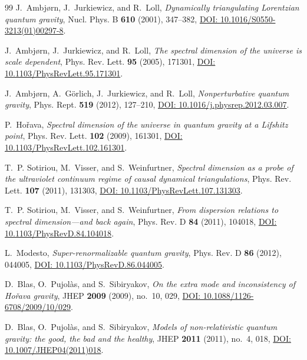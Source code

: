 \documentclass[11pt,a4paper,reqno]{amsart}
\theoremstyle{definition}
\numberwithin{equation}{section}
\begin{document}
\begin{thebibliography}{99}
J.~Ambj{\o}rn, J.~Jurkiewicz, and R.~Loll,
\emph{Dynamically triangulating Lorentzian quantum gravity},
Nucl. Phys. B \textbf{610} (2001), 347--382, \href{https://doi.org/10.1016/S0550-3213(01)00297-8}{DOI: 10.1016/S0550-3213(01)00297-8}.

J.~Ambj{\o}rn, J.~Jurkiewicz, and R.~Loll,
\emph{The spectral dimension of the universe is scale dependent},
Phys. Rev. Lett. \textbf{95} (2005), 171301, \href{https://doi.org/10.1103/PhysRevLett.95.171301}{DOI: 10.1103/PhysRevLett.95.171301}.

J.~Ambj{\o}rn, A.~G{\"o}rlich, J.~Jurkiewicz, and R.~Loll,
\emph{Nonperturbative quantum gravity},
Phys. Rept. \textbf{519} (2012), 127--210, \href{https://doi.org/10.1016/j.physrep.2012.03.007}{DOI: 10.1016/j.physrep.2012.03.007}.

P.~Ho\v{r}ava,
\emph{Spectral dimension of the universe in quantum gravity at a Lifshitz point},
Phys. Rev. Lett. \textbf{102} (2009), 161301, \href{https://doi.org/10.1103/PhysRevLett.102.161301}{DOI: 10.1103/PhysRevLett.102.161301}.

T.~P. Sotiriou, M.~Visser, and S.~Weinfurtner,
\emph{Spectral dimension as a probe of the ultraviolet continuum regime of causal dynamical triangulations},
Phys. Rev. Lett. \textbf{107} (2011), 131303, \href{https://doi.org/10.1103/PhysRevLett.107.131303}{DOI: 10.1103/PhysRevLett.107.131303}.

T.~P. Sotiriou, M.~Visser, and S.~Weinfurtner,
\emph{From dispersion relations to spectral dimension---and back again},
Phys. Rev. D \textbf{84} (2011), 104018, \href{https://doi.org/10.1103/PhysRevD.84.104018}{DOI: 10.1103/PhysRevD.84.104018}.

L.~Modesto,
\emph{Super-renormalizable quantum gravity},
Phys. Rev. D \textbf{86} (2012), 044005, \href{https://doi.org/10.1103/PhysRevD.86.044005}{DOI: 10.1103/PhysRevD.86.044005}.

D.~Blas, O.~Pujol\`as, and S.~Sibiryakov,
\emph{On the extra mode and inconsistency of Ho\v{r}ava gravity},
JHEP \textbf{2009} (2009), no.~10, 029, \href{https://doi.org/10.1088/1126-6708/2009/10/029}{DOI: 10.1088/1126-6708/2009/10/029}.

D.~Blas, O.~Pujol\`as, and S.~Sibiryakov,
\emph{Models of non-relativistic quantum gravity: the good, the bad and the healthy},
JHEP \textbf{2011} (2011), no.~4, 018, \href{https://doi.org/10.1007/JHEP04(2011)018}{DOI: 10.1007/JHEP04(2011)018}.


\end{thebibliography}
\end{document}
